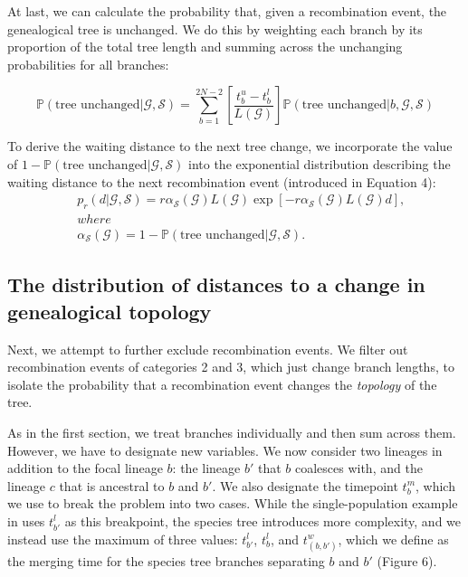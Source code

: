 \documentclass[11pt]{article}
\begin{document}
At last, we can calculate the probability that, given a recombination event, the genealogical tree is unchanged. We do this by weighting each branch by its proportion of the total tree length and summing across the unchanging probabilities for all branches:

\begin{equation}
	\mathbb{P}(\textrm{tree unchanged} | \mathcal{G},\mathcal{S}) = \sum_{b=1}^{2N-2}\left[\frac{t^u_b-t^l_b}{L(\mathcal{G})}\right]\mathbb{P}(\textrm{tree unchanged} | b,\mathcal{G},\mathcal{S})
\end{equation}

To derive the waiting distance to the next tree change, we incorporate the value of $1-\mathbb{P}(\textrm{tree unchanged} | \mathcal{G},\mathcal{S})$ into the exponential distribution describing the waiting distance to the next recombination event (introduced in Equation 4):
\begin{equation}
\begin{aligned}
	&p_r(d|\mathcal{G},\mathcal{S}) = r\alpha_\mathcal{S}(\mathcal{G})L(\mathcal{G})\exp\left[-r\alpha_\mathcal{S}(\mathcal{G})L(\mathcal{G})d\right]\textrm{,} \\
	&where \\
	&\alpha_\mathcal{S}(\mathcal{G})=1-\mathbb{P}(\textrm{tree unchanged} | \mathcal{G},\mathcal{S}).
\end{aligned}
\end{equation}

\subsection{The distribution of distances to a change in genealogical topology}

Next, we attempt to further exclude recombination events. We filter out recombination events of categories 2 and 3, which just change branch lengths, to isolate the probability that a recombination event changes the \emph{topology} of the tree.

As in the first section, we treat branches individually and then sum across them. However, we have to designate new variables. We now consider two lineages in addition to the focal lineage $b$: the lineage $b'$ that $b$ coalesces with, and the lineage $c$ that is ancestral to $b$ and $b'$. We also designate the timepoint $t_b^m$, which we use to break the problem into two cases. While the single-population example in \citet{deng_distribution_2021} uses $t_{b'}^l$ as this breakpoint, the species tree introduces more complexity, and we instead use the maximum of three values: $t_{b'}^l$, $t_{b}^l$, and $t_{(b,b')}^w$, which we define as the merging time for the species tree branches separating $b$ and $b'$ (Figure 6).
\end{document}
